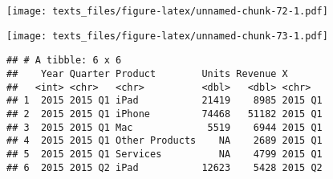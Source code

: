 \documentclass[]{book}
\newenvironment{Shaded}{\begin{snugshade}}{\end{snugshade}}
\newcommand{\DataTypeTok}[1]{\textcolor[rgb]{0.13,0.29,0.53}{#1}}
\newcommand{\KeywordTok}[1]{\textcolor[rgb]{0.13,0.29,0.53}{\textbf{#1}}}
\newcommand{\NormalTok}[1]{#1}
\newcommand{\OperatorTok}[1]{\textcolor[rgb]{0.81,0.36,0.00}{\textbf{#1}}}
\newcommand{\StringTok}[1]{\textcolor[rgb]{0.31,0.60,0.02}{#1}}
\begin{document}
\begin{Shaded}
\end{Shaded}

\texttt{[image: texts\_files/figure-latex/unnamed-chunk-72-1.pdf]}

\begin{Shaded}
\end{Shaded}

\texttt{[image: texts\_files/figure-latex/unnamed-chunk-73-1.pdf]}

\begin{Shaded}
\end{Shaded}

\begin{verbatim}
## # A tibble: 6 x 6
##    Year Quarter Product        Units Revenue X      
##   <int> <chr>   <chr>          <dbl>   <dbl> <chr>  
## 1  2015 2015 Q1 iPad           21419    8985 2015 Q1
## 2  2015 2015 Q1 iPhone         74468   51182 2015 Q1
## 3  2015 2015 Q1 Mac             5519    6944 2015 Q1
## 4  2015 2015 Q1 Other Products    NA    2689 2015 Q1
## 5  2015 2015 Q1 Services          NA    4799 2015 Q1
## 6  2015 2015 Q2 iPad           12623    5428 2015 Q2
\end{verbatim}
\end{document}
